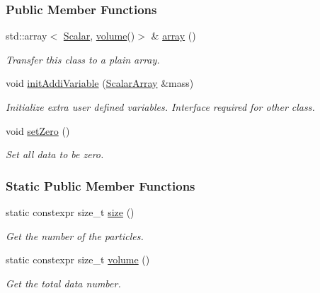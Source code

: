 \subsubsection*{Public Member Functions}
\begin{DoxyCompactItemize}
\item 
std\+::array$<$ \mbox{\hyperlink{classdynamics_a444c7534e86115117798563cb0e43cde}{Scalar}}, \mbox{\hyperlink{classdynamics_ada4a2418d86de3072e1a238a95e6bdb2}{volume}}()$>$ \& \mbox{\hyperlink{classdynamics_add2d27f86c6f415999e9e7dd05cc8025}{array}} ()
\begin{DoxyCompactList}\small\item\em Transfer this class to a plain array. \end{DoxyCompactList}\item 
void \mbox{\hyperlink{classdynamics_a4f6f246917f12269d3bd4a428bd40752}{init\+Addi\+Variable}} (\mbox{\hyperlink{classdynamics_ac31f831ea1577092662dafd2daba0f48}{Scalar\+Array}} \&mass)
\begin{DoxyCompactList}\small\item\em Initialize extra user defined variables. Interface required for other class. \end{DoxyCompactList}\item 
void \mbox{\hyperlink{classdynamics_a4dc0dd48fd48ef5cfc0128faaeb22b32}{set\+Zero}} ()
\begin{DoxyCompactList}\small\item\em Set all data to be zero. \end{DoxyCompactList}\end{DoxyCompactItemize}
\subsubsection*{Static Public Member Functions}
\begin{DoxyCompactItemize}
\item 
static constexpr size\+\_\+t \mbox{\hyperlink{classdynamics_a414656e44a6981327ae59af4deea9b8c}{size}} ()
\begin{DoxyCompactList}\small\item\em Get the number of the particles. \end{DoxyCompactList}\item 
static constexpr size\+\_\+t \mbox{\hyperlink{classdynamics_ada4a2418d86de3072e1a238a95e6bdb2}{volume}} ()
\begin{DoxyCompactList}\small\item\em Get the total data number. \end{DoxyCompactList}\end{DoxyCompactItemize}

